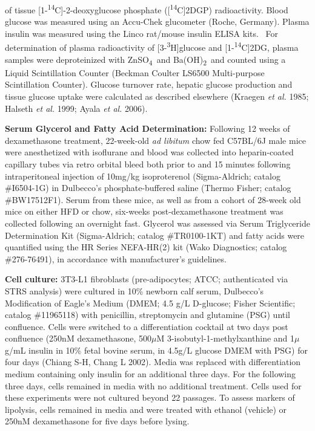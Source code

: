 \documentclass[11pt]{article} %
\begin{document}
of tissue {[}1-\textsuperscript{14}C{]}-2-deoxyglucose phosphate
({[}\textsuperscript{14}C{]}2DGP) radioactivity. Blood glucose was
measured using an Accu-Chek glucometer (Roche, Germany). Plasma insulin
was measured using the Linco rat/mouse insulin ELISA kits.~ For
determination of plasma radioactivity of
{[}3-\textsuperscript{3}H{]}glucose and
{[}1-\textsuperscript{14}C{]}2DG, plasma samples were deproteinized with
ZnSO\textsubscript{4}~and Ba(OH)\textsubscript{2}~and counted using a
Liquid Scintillation Counter (Beckman Coulter LS6500 Multi-purpose
Scintillation Counter). Glucose turnover rate, hepatic glucose
production and tissue glucose uptake were calculated as described
elsewhere (Kraegen \emph{et al.} 1985; Halseth \emph{et al.} 1999; Ayala
\emph{et al.} 2006).

\textbf{Serum Glycerol and Fatty Acid Determination:} Following 12 weeks
of dexamethasone treatment, 22-week-old \emph{ad libitum} chow fed
C57BL/6J male mice were anesthetized with isoflurane and blood was
collected into heparin-coated capillary tubes via retro orbital bleed
both prior to and 15 minutes following intraperitoneal injection of
10mg/kg isoproterenol (Sigma-Aldrich; catalog \#I6504-1G) in Dulbecco's
phosphate-buffered saline (Thermo Fisher; catalog \#BW17512F1). Serum
from these mice, as well as from a cohort of 28-week old mice on either
HFD or chow, six-weeks post-dexamethasone treatment was collected
following an overnight fast. Glycerol was assessed via Serum
Triglyceride Determination Kit (Sigma-Aldrich; catalog \#TR0100-1KT) and
fatty acids were quantified using the HR Series NEFA-HR(2) kit (Wako
Diagnostics; catalog \#276-76491), in accordance with manufacturer's
guidelines.

\textbf{Cell culture:} 3T3-L1 fibroblasts (pre-adipocytes; ATCC;
authenticated via STRS analysis) were cultured in 10\% newborn calf
serum, Dulbecco's Modification of Eagle's Medium (DMEM; 4.5 g/L
D-glucose; Fisher Scientific; catalog \#11965118) with penicillin,
streptomycin and glutamine (PSG) until confluence. Cells were switched
to a differentiation cocktail at two days post confluence (250nM
dexamethasone, 500$\mu$M 3-isobutyl-1-methylxanthine and 1$\mu$g/mL insulin in
10\% fetal bovine serum, in 4.5g/L glucose DMEM with PSG) for four days
(Chiang S-H, Chang L 2002). Media was replaced with differentiation
medium containing only insulin for an additional three days. For the
following three days, cells remained in media with no additional
treatment. Cells used for these experiments were not cultured beyond 22
passages. To assess markers of lipolysis, cells remained in media and
were treated with ethanol (vehicle) or 250nM dexamethasone for five days
before lysing.
\end{document}
